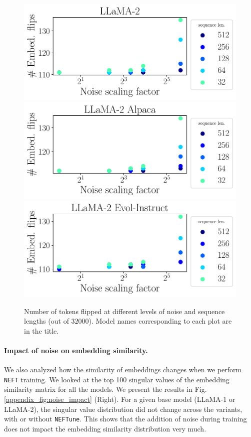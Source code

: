 \documentclass{article} %
\newcommand{\neft}{\texttt{NEFT}}
\newcommand{\neftune}{\texttt{NEFTune}}
\newcommand{\llama}{LLaMA}
\begin{document}
\begin{figure}[!h]
    \centering
     \includegraphics[width=0.45\linewidth]{figures/figs_appendix/embed_flips_LLaMA_2.pdf}
     \includegraphics[width=0.45\linewidth]{figures/figs_appendix/embed_flips_LLaMA_2_Alpaca.pdf}
     \includegraphics[width=0.45\linewidth]{figures/figs_appendix/embed_flips_LLaMA_2_Evol_Instruct.pdf}
   
    \caption{ Number of tokens flipped at different levels of noise and sequence lengths (out of $32000$). Model names corresponding to each plot are in the title. }
    \label{appendix_fig:embedding_noise_flips}
\end{figure}



\paragraph{Impact of noise on embedding similarity.}
We also analyzed how the similarity of embeddings changes when we perform \neft{} training. We looked at the top 100 singular values of the embedding similarity matrix for all the models. We present the results in Fig.\ref{appendix_fig:noise_impact} (Right). For a given base model (\llama{}-1 or \llama{}-2), the singular value distribution did not change across the variants, with or without \neftune{}. This shows that the addition of noise during training does not impact the embedding similarity distribution very much.
\end{document}
